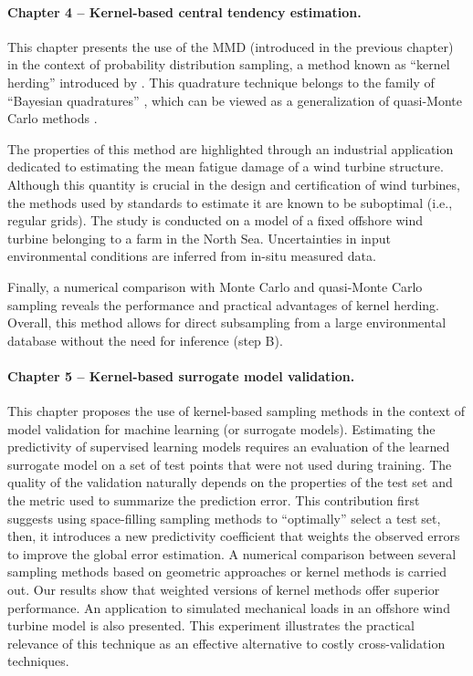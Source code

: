 \paragraph{Chapter 4 -- Kernel-based central tendency estimation.} 
This chapter presents the use of the MMD (introduced in the previous chapter) in the context of probability distribution sampling, a method known as ``kernel herding'' introduced by \citet{chen_welling_2010}. 
This quadrature technique belongs to the family of ``Bayesian quadratures'' \citet{briol_oates_2019}, which can be viewed as a generalization of quasi-Monte Carlo methods \citep{hickernell_2020}. 

The properties of this method are highlighted through an industrial application dedicated to estimating the mean fatigue damage of a wind turbine structure. 
Although this quantity is crucial in the design and certification of wind turbines, the methods used by standards to estimate it are known to be suboptimal (i.e., regular grids). 
The study is conducted on a model of a fixed offshore wind turbine belonging to a farm in the North Sea. 
Uncertainties in input environmental conditions are inferred from in-situ measured data. 

Finally, a numerical comparison with Monte Carlo and quasi-Monte Carlo sampling reveals the performance and practical advantages of kernel herding. 
Overall, this method allows for direct subsampling from a large environmental database without the need for inference (step B).


\paragraph{Chapter 5 -- Kernel-based surrogate model validation.} 
This chapter proposes the use of kernel-based sampling methods in the context of model validation for machine learning (or surrogate models). 
Estimating the predictivity of supervised learning models requires an evaluation of the learned surrogate model on a set of test points that were not used during training. 
The quality of the validation naturally depends on the properties of the test set and the metric used to summarize the prediction error. 
This contribution first suggests using space-filling sampling methods to ``optimally'' select a test set, then, 
it introduces a new predictivity coefficient that weights the observed errors to improve the global error estimation. 
A numerical comparison between several sampling methods based on geometric approaches \citep{shang_apley_2020} or kernel methods \citep{chen_welling_2010,mak_joseph_2018} is carried out. 
Our results show that weighted versions of kernel methods offer superior performance. 
An application to simulated mechanical loads in an offshore wind turbine model is also presented. 
This experiment illustrates the practical relevance of this technique as an effective alternative to costly cross-validation techniques.

